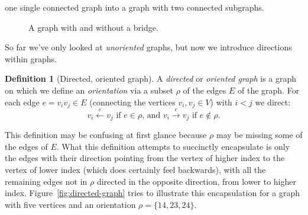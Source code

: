 \documentclass{amsart}
\theoremstyle{plain}
\theoremstyle{remark}
\theoremstyle{definition}
\newtheorem*{definition}{Definition}
\begin{document}
one single connected graph into a graph with two connected subgraphs.
\begin{figure}[h]
  \hspace{1cm}
  \caption[Bridges]{A graph with and without a bridge.}
  \label{fig:bridge}
\end{figure}
So far we've only looked at \emph{unoriented} graphs, but
now we introduce directions within graphs.
\begin{definition}[Directed, oriented graph]
  A \emph{directed} or \emph{oriented graph} is a graph on which we
  define an \emph{orientation} via a subset $\rho$ of the edges $E$ of the
  graph. For each edge $e=v_i v_j\in E$ (connecting the vertices $v_i,v_j\in
  V$) with $i<j$ we direct:
  \[
    v_i\stackrel{e}{\leftarrow}v_j\text{ if }e\in\rho\text{, and }
    v_i\stackrel{e}{\rightarrow}v_j\text{ if }e\notin\rho.
  \]
\end{definition}
This definition may be confusing at first glance because $\rho$
may be missing some of the edges of $E$. What this definition attempts to succinctly
encapsulate is only the edges with their direction pointing from the vertex of higher
index to the vertex of lower index (which does certainly feel backwards),
with all the remaining edges not in $\rho$ directed in the opposite direction,
from lower to higher index.
Figure~\ref{fig:directed-graph} tries to illustrate this encapsulation for a graph
with five vertices and an orientation $\rho=\{14,23,24\}$.
\end{document}
